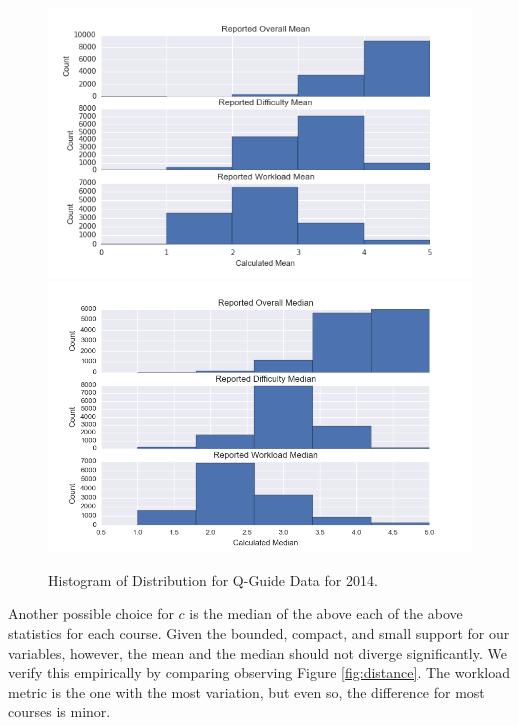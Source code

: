 \begin{figure}[h!]
\centering
\includegraphics[scale=0.36]{mean}
\includegraphics[scale=0.36]{median}
\caption{Histogram of Distribution for Q-Guide Data for 2014. }
\label{fig:mean_median}
\end{figure}

Another possible choice for $c$ is the median of the above each of the above statistics for each course. Given the bounded, compact, and small support for our variables, however, the mean and the median should not diverge significantly. We verify this empirically by comparing observing Figure \ref{fig:distance}. The workload metric is the one with the most variation, but even so, the difference for most courses is minor.

